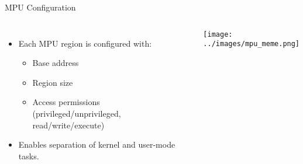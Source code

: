 \begin{frame}{MPU Configuration}
    \begin{columns}
        \begin{itemize}
            \item Each MPU region is configured with:
            \begin{itemize}
                \item Base address
                \item Region size
                \item Access permissions (privileged/unprivileged, read/write/execute)
            \end{itemize}
            \item Enables separation of kernel and user-mode tasks.
        \end{itemize}
        \centering
        \texttt{[image: ../images/mpu\_meme.png]}
    \end{columns}
\end{frame}


